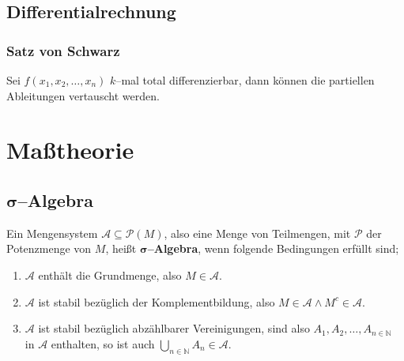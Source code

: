\documentclass[a4paper,12pt]{article}
\numberwithin{equation}{section}
\begin{document}
\subsection{Differentialrechnung}
\subsubsection{Satz von Schwarz}
Sei $f\left(x_1,x_2,\hdots ,x_n\right)$ $k$--mal total differenzierbar, dann können die partiellen Ableitungen vertauscht werden.


\newpage
\section{Maßtheorie}
\subsection{$\boldsymbol{\sigma }$--Algebra}
Ein Mengensystem $\mathcal{A}\subseteq \mathcal{P}\left(M\right)$, also eine Menge von Teilmengen, mit $\mathcal{P}$ der Potenzmenge von $M$, heißt \textbf{$\boldsymbol{\sigma }$--Algebra}, wenn folgende Bedingungen erfüllt sind;
\begin{enumerate}[label=$\circ$]
        \item $\mathcal{A}$ enthält die Grundmenge, also $M \in \mathcal{A}$.
        \item $\mathcal{A}$ ist stabil bezüglich der Komplementbildung, also $M \in \mathcal{A}\land M^c  \in \mathcal{A}$.
        \item $\mathcal{A}$ ist stabil bezüglich abzählbarer Vereinigungen, sind also $A_1,A_2,\hdots ,A_{n  \in \mathbb{N}}$ in $\mathcal{A}$ enthalten, so ist auch $\bigcup _{n  \in \mathbb{N}}A_n  \in \mathcal{A}$.
\end{enumerate}
\end{document}
